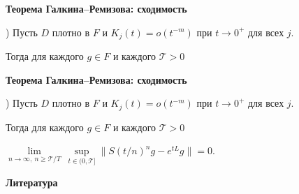 \documentclass[11pt]{article}
\begin{document}
\newpage

\begin{center}
{\color{notaeYELLOW}\bfseries\fontsize{44}{52}\selectfont Теорема Галкина--Ремизова: сходимость}
\end{center}
\vspace*{\fill}
\begin{center}
\fontsize{36}{43}\selectfont
\parbox{\linewidth}{\centering{}) Пусть $D$ плотно в $F$ и $K_j(t)=o(t^{-m})$ при $t\to0^+$ для всех $j$.
\par}\vspace{0.4in}
\parbox{\linewidth}{\centering\noindent Тогда для каждого $g\in F$ и каждого $\mathcal{T}>0$
\par}\vspace{0.4in}
\end{center}
\vspace*{\fill}

\newpage

\begin{center}
{\color{notaeYELLOW}\bfseries\fontsize{44}{52}\selectfont Теорема Галкина--Ремизова: сходимость}
\end{center}
\vspace*{\fill}
\begin{center}
\fontsize{36}{43}\selectfont
\parbox{\linewidth}{\centering{}) Пусть $D$ плотно в $F$ и $K_j(t)=o(t^{-m})$ при $t\to0^+$ для всех $j$.
\par}\vspace{0.4in}
\parbox{\linewidth}{\centering\noindent Тогда для каждого $g\in F$ и каждого $\mathcal{T}>0$
\par}\vspace{0.4in}
\parbox{\linewidth}{\centering\noindent $\lim\limits_{n\to\infty,\ n\ge\mathcal{T}/T}\ \sup\limits_{t\in(0,\mathcal{T}]}\bigl\|S(t/n)^n g-e^{tL}g\bigr\|=0.$
\par}\vspace{0.4in}
\end{center}
\vspace*{\fill}

\newpage

\begin{center}
{\color{notaeYELLOW}\bfseries\fontsize{44}{52}\selectfont Литература}
\end{center}
\vspace*{\fill}
\begin{center}
\fontsize{36}{43}\selectfont
\end{center}
\vspace*{\fill}
\end{document}

